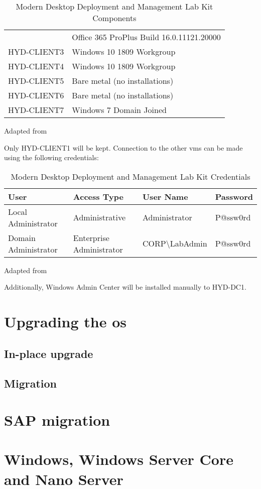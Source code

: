 \begin{table}[ht]
\begin{adjustbox}{width=1\textwidth}
\begin{tabular}{l|l}
		& Office 365 ProPlus Build 16.0.11121.20000                           									 \\
		HYD-CLIENT3  & Windows 10 1809 Workgroup                                         						  \\
		HYD-CLIENT4  & Windows 10 1809 Workgroup                                          						   \\
		HYD-CLIENT5 & Bare metal (no installations)                                      						    \\
		HYD-CLIENT6 & Bare metal (no installations)                                       							 \\
		HYD-CLIENT7  & Windows 7 Domain Joined                                            
	\end{tabular}
	\end{adjustbox}
	\caption[Lab Kit Components]{Modern Desktop Deployment and Management Lab Kit Components}
	\scriptsize	
	Adapted from \cite{MicrosoftCorporation2019}
	\label{tab:MDDMLK2016}
\end{table}

	
Only HYD-CLIENT1 will be kept. Connection to the other \acrshort{vm}s can be made using the following credentials:
\begin{table}[ht]
	\centering
	\begin{adjustbox}{width=1\textwidth}
	\begin{tabular}{l|lll}
		User                 & Access Type              & User Name                    & Password \\
		\hline
		Local Administrator  & Administrative           & Administrator                & P@ssw0rd \\
		Domain Administrator & Enterprise Administrator & CORP\textbackslash{}LabAdmin & P@ssw0rd
	\end{tabular}
	\end{adjustbox}
	\caption[Lab Kit Credentials]{Modern Desktop Deployment and Management Lab Kit Credentials}
	\scriptsize	
	Adapted from \cite{MicrosoftCorporation2019}
	\label{tab:MDDMLK2016}
\end{table}

Additionally, Windows Admin Center will be installed manually to HYD-DC1. 


\section{Upgrading the \acrshort{os}}
\subsection{In-place upgrade}
\subsection{Migration}
\section{SAP migration}
\section{Windows, Windows Server Core and Nano Server}

